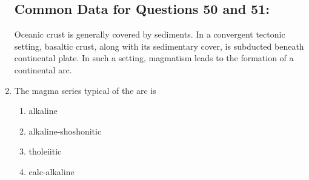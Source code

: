 \documentclass[journal,12pt,onecolumn]{IEEEtran}
\theoremstyle{remark}
\begin{document}
\begin{enumerate}[resume]
\subsection*{Common Data for Questions 50 and 51: }  
\vspace{0.5cm}
Oceanic crust is generally covered by sediments. In a convergent tectonic setting, basaltic crust, along with its sedimentary cover, is subducted beneath continental plate. In such a setting, magmatism leads to the
formation of a continental arc. 
\vspace{0.5cm}











\item The magma series typical of the arc is
\begin{enumerate}
\item alkaline  
\item alkaline-shoshonitic  
\item tholeiitic  
\item calc-alkaline  
\end{enumerate}

\end{enumerate}
\end{document}
